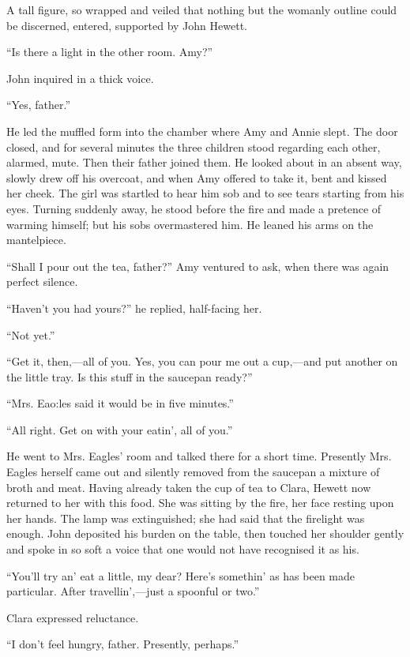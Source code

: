{\protect\hypertarget{297}{}{}}A tall figure, so wrapped and veiled that
nothing but the womanly outline could be discerned, entered, supported
by John Hewett.

``Is there a light in the other room. Amy?''

John inquired in a thick voice.

``Yes, father.''

He led the muffled form into the chamber where Amy and Annie slept. The
door closed, and for several minutes the three children stood regarding
each other, alarmed, mute. Then their father joined them. He looked
about in an absent way, slowly drew off his overcoat, and when Amy
offered to take it, bent and kissed her cheek. The girl was startled to
hear him sob and to see tears starting from his eyes. Turning suddenly
away, he stood before the fire and made a pretence of warming himself;
but his sobs overmastered him. He leaned his arms on the mantelpiece.

``Shall I pour out the tea, father?'' Amy ventured to ask, when there
was again perfect silence.

{\protect\hypertarget{298}{}{}}``Haven't you had yours?'' he replied,
half-facing her.

``Not yet.''

``Get it, then,---all of you. Yes, you can pour me out a cup,---and put
another on the little tray. Is this stuff in the saucepan ready?''

``Mrs. Eao:les said it would be in five minutes.''

``All right. Get on with your eatin', all of you.''

He went to Mrs. Eagles' room and talked there for a short time.
Presently Mrs. Eagles herself came out and silently removed from the
saucepan a mixture of broth and meat. Having already taken the cup of
tea to Clara, Hewett now returned to her with this food. She was sitting
by the fire, her face resting upon her hands. The lamp was extinguished;
she had said that the firelight was enough. John deposited his burden on
the table, then touched her shoulder gently and spoke in so soft a voice
that one would not have recognised it as his.

{\protect\hypertarget{299}{}{}}``You'll try an' eat a little, my dear?
Here's somethin' as has been made particular. After travellin',---just a
spoonful or two.''

Clara expressed reluctance.

``I don't feel hungry, father. Presently, perhaps.''

